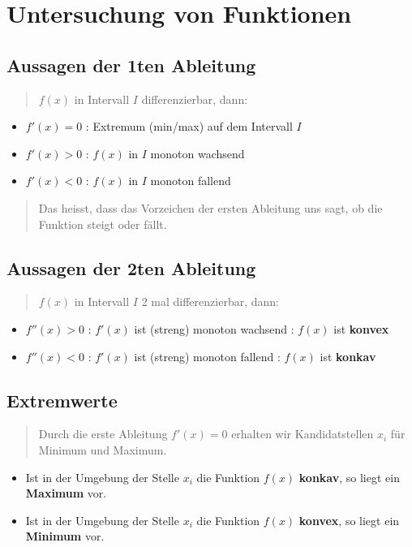 \section*{Untersuchung von Funktionen}


\subsection*{Aussagen der 1ten Ableitung}
\begin{quote}
$f(x)$ in Intervall $I$ differenzierbar, dann:\end{quote}
\begin{itemize}
\item $f'(x)=0$ : Extremum (min/max) auf dem Intervall $I$
\item $f'(x)>0$ : $f(x)$ in $I$ monoton wachsend
\item $f'(x)<0$ : $f(x)$ in $I$ monoton fallend\end{itemize}
\begin{quote}
Das heisst, dass das Vorzeichen der ersten Ableitung uns sagt, ob
die Funktion steigt oder fällt.
\end{quote}

\subsection*{Aussagen der 2ten Ableitung}
\begin{quote}
$f(x)$ in Intervall $I$ 2 mal differenzierbar, dann:\end{quote}
\begin{itemize}
\item \textbf{$f''(x)>0$} : $f'(x)$ ist (streng) monoton wachsend : $f(x)$
ist \textbf{konvex}
\item \textbf{$f''(x)<0$ }: $f'(x)$ ist (streng) monoton fallend : $f(x)$
ist \textbf{konkav}
\end{itemize}

\subsection*{Extremwerte}
\begin{quote}
Durch die erste Ableitung $f'(x)=0$ erhalten wir Kandidatstellen
$x_{i}$ für Minimum und Maximum.\end{quote}
\begin{itemize}
\item Ist in der Umgebung der Stelle $x_{i}$ die Funktion $f(x)$ \textbf{konkav},
so liegt ein \textbf{Maximum} vor.
\item Ist in der Umgebung der Stelle $x_{i}$ die Funktion $f(x)$ \textbf{konvex},
so liegt ein \textbf{Minimum} vor.
\end{itemize}

